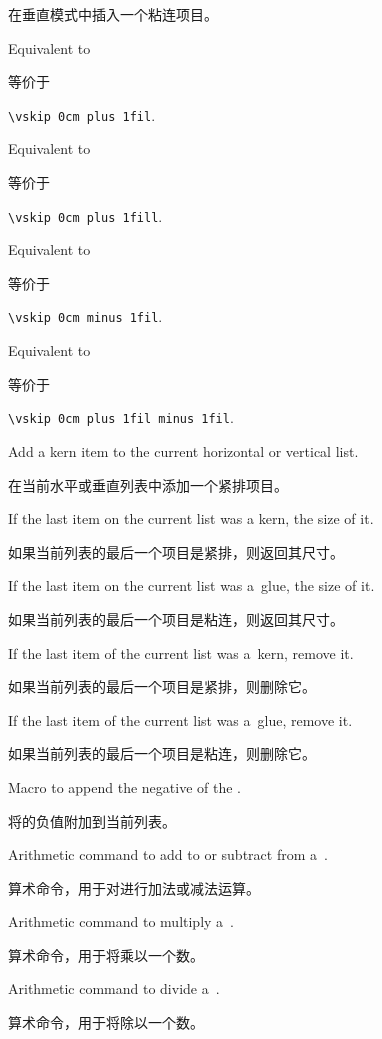 \begin{inventory}
      在垂直模式中插入一个粘连项目。
\item [\csidx{vfil}] 
      Equivalent to 

      等价于

      \verb-\vskip 0cm plus 1fil-.

\item [\csidx{vfill}] 
      Equivalent to 

      等价于

      \verb-\vskip 0cm plus 1fill-.

\item [\csidx{vfilneg}] 
      Equivalent to 

      等价于

      \verb-\vskip 0cm minus 1fil-.

\item [\csidx{vss}] 
      Equivalent to 
      
      等价于

      \verb-\vskip 0cm plus 1fil minus 1fil-.

\item [\cs{kern}]  
      Add a kern item to the current horizontal or vertical list.

      在当前水平或垂直列表中添加一个紧排项目。
\item [\cs{lastkern}] 
      If the last item on the current list was a kern, the size of it.

      如果当前列表的最后一个项目是紧排，则返回其尺寸。
\item [\cs{lastskip}] 
      If the last item on the current list was a~glue, the size of it.

      如果当前列表的最后一个项目是粘连，则返回其尺寸。
\item [\cs{unkern}] 
      If the last item of the current list was a~kern, remove it.

      如果当前列表的最后一个项目是紧排，则删除它。
\item [\cs{unskip}] 
      If the last item of the current list was a~glue, remove it.

      如果当前列表的最后一个项目是粘连，则删除它。
\item [\cs{removelastskip}]
      Macro to append the negative of the .

      将的负值附加到当前列表。
\item [\cs{advance}] 
      Arithmetic command to add to or subtract from
      a~.

      算术命令，用于对进行加法或减法运算。
\item [\cs{multiply}] 
      Arithmetic command to multiply a~.

      算术命令，用于将乘以一个数。
\item [\cs{divide}] 
      Arithmetic command to divide a~.

      算术命令，用于将除以一个数。
\end{inventory} 


